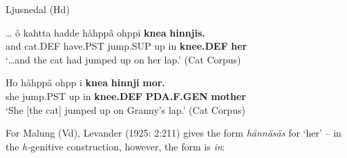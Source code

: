 
\item 

Ljusnedal (Hd)



\item 


 \ea\label{}
\gll …  ô  kahtta  hadde  håhppâ  ohppi  \textbf{knea} \textbf{hinnjis.} \\


  and  cat.DEF  have.PST  jump.SUP  up in  \textbf{knee.DEF} \textbf{her} \\

\glt  ‘…and the cat had jumped up on her lap.’ (Cat Corpus)

\z

\item 


 \ea\label{}
\gll Ho  håhppâ  ohpp  i  \textbf{knea} \textbf{hinnji} \textbf{mor.}\\


she  jump.PST  up  in  \textbf{knee.DEF} \textbf{PDA.F.GEN} \textbf{mother}\\

\glt ‘She [the cat] jumped up on Granny’s lap.’ (Cat Corpus)

\z

For Malung (Vd), Levander (1925: 2:211) gives the form \textit{hännäsäs} for ‘her’ – in the \textit{h-}genitive construction, however, the form is \textit{in}: 


\item 

